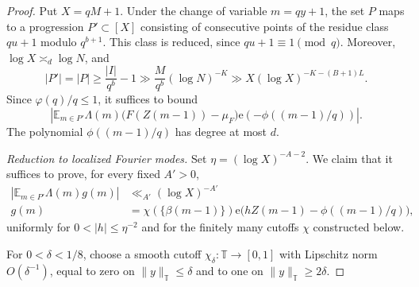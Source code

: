 \documentclass[12pt]{amsart}
\newcommand{\1}{\mathbf 1}
\newcommand{\e}{\mathrm e}
\theoremstyle{definition}
\begin{document}
\begin{proof}
Put \(X=qM+1\). Under the change of variable \(m=qy+1\), the
set \(P\) maps to a progression \(P'\subset[X]\) consisting of
consecutive points of the residue class \(qu+1\) modulo
\(q^{b+1}\). This class is reduced, since \(qu+1\equiv1\pmod q\).
Moreover, \(\log X\asymp_d\log N\), and
\[
 |P'|=|P|\geq \frac{|I|}{q^b}-1
 \gg \frac{M}{q^b}(\log N)^{-K}
 \gg X(\log X)^{-K-(B+1)L}.
\]
Since \(\varphi(q)/q\leq1\), it suffices to bound
\[
 \left|\mathbb E_{m\in P'}\Lambda(m)
 \bigl(F(Z(m-1))-\mu_F\bigr)\e(-\phi((m-1)/q))\right|.
\]
The polynomial \(\phi((m-1)/q)\) has degree at most \(d\).

\medskip
\noindent\emph{Reduction to localized Fourier modes.}
Set \(\eta=(\log X)^{-A-2}\). We claim that it suffices to prove,
for every fixed \(A'>0\),
\begin{align}\label{e:reductiontoexpfun}
    \left|\mathbb E_{m\in P'}\Lambda(m)g(m)\right|
 &\ll_{A'}(\log X)^{-A'}\\
 g(m)&=\chi(\{\beta(m-1)\})
       \e\bigl(hZ(m-1)-\phi((m-1)/q)\bigr), \nonumber
\end{align}
uniformly for \(0<|h|\leq\eta^{-2}\) and for the finitely many
cutoffs \(\chi\) constructed below.

For $0<\delta<1/8$, choose a smooth cutoff
$\chi_\delta:\mathbb T\to[0,1]$ with Lipschitz norm
$O(\delta^{-1})$, equal to zero on $\|y\|_{\mathbb T}\leq\delta$
and to one on $\|y\|_{\mathbb T}\geq2\delta$.


\end{proof}
\end{document}
